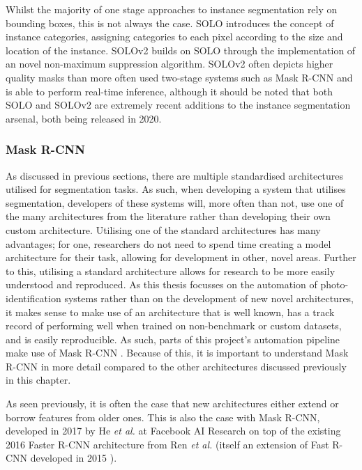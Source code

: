Whilst the majority of one stage approaches to instance segmentation rely on bounding boxes, this is not always the case. SOLO \cite{wang_solo_2020} introduces the concept of instance categories, assigning categories to each pixel according to the size and location of the instance. SOLOv2 \cite{wang_solov2_2020} builds on SOLO through the implementation of an novel non-maximum suppression algorithm. SOLOv2 often depicts higher quality masks than more often used two-stage systems such as Mask R-CNN and is able to perform real-time inference, although it should be noted that both SOLO and SOLOv2 are extremely recent additions to the instance segmentation arsenal, both being released in 2020. 

\subsubsection{Mask R-CNN}\label{ch:Background,sec:instanceSegmentation,sub:Mask R-CNN}

As discussed in previous sections, there are multiple standardised architectures utilised for segmentation tasks. As such, when developing a system that utilises segmentation, developers of these systems will, more often than not, use one of the many architectures from the literature rather than developing their own custom architecture. Utilising one of the standard architectures has many advantages; for one, researchers do not need to spend time creating a model architecture for their task, allowing for development in other, novel areas. Further to this, utilising a standard architecture allows for research to be more easily understood and reproduced. As this thesis focusses on the automation of photo-identification systems rather than on the development of new novel architectures, it makes sense to make use of an architecture that is well known, has a track record of performing well when trained on non-benchmark or custom datasets, and is easily reproducible. As such, parts of this project's automation pipeline make use of Mask R-CNN \cite{he_mask_2017}. Because of this, it is important to understand Mask R-CNN in more detail compared to the other architectures discussed previously in this chapter. 

As seen previously, it is often the case that new architectures either extend or borrow features from older ones. This is also the case with Mask R-CNN, developed in 2017 by He \textit{et al.} at Facebook AI Research on top of the existing 2016 Faster R-CNN architecture from Ren \textit{et al.} \cite{ren_faster_2015} (itself an extension of Fast R-CNN developed in 2015 \cite{girshick_fast_2015}). 

